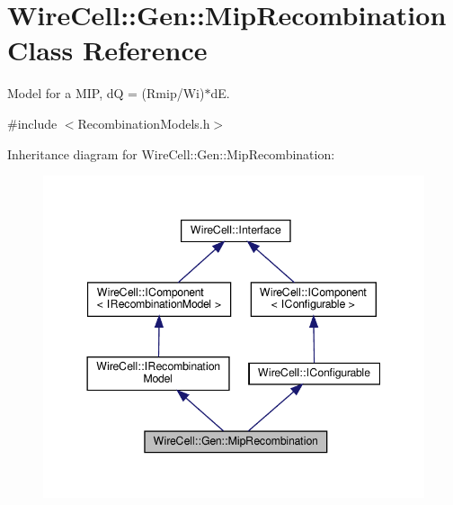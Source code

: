 \hypertarget{class_wire_cell_1_1_gen_1_1_mip_recombination}{}\section{Wire\+Cell\+:\+:Gen\+:\+:Mip\+Recombination Class Reference}
\label{class_wire_cell_1_1_gen_1_1_mip_recombination}


Model for a M\+IP, dQ = (Rmip/\+Wi)$\ast$dE.  




{\ttfamily \#include $<$Recombination\+Models.\+h$>$}



Inheritance diagram for Wire\+Cell\+:\+:Gen\+:\+:Mip\+Recombination\+:
\nopagebreak
\begin{figure}[H]
\begin{center}
\leavevmode
\includegraphics[width=344pt]{class_wire_cell_1_1_gen_1_1_mip_recombination__inherit__graph}
\end{center}
\end{figure}



